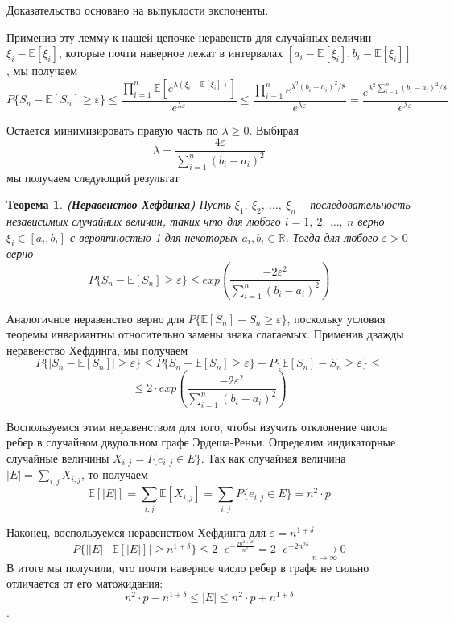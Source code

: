 \documentclass[a4paper]{article}
\newtheorem{mtheorem}{Теорема}[section]
\begin{document}
Доказательство основано на выпуклости экспоненты.

Применив эту лемму к нашей цепочке неравенств для случайных величин $\xi_i - \mathbb{E}[\xi_i]$, которые
почти наверное лежат в интервалах $[a_i - \mathbb{E}[\xi_i], b_i - \mathbb{E}[\xi_i]]$, мы получаем 
$$P\{S_n - \mathbb{E}[S_n] \geq \varepsilon\} \leq \frac{\prod\limits_{i=1}^n\mathbb{E}[e^{\lambda(\xi_i - \mathbb{E}[\xi_i])}]}{e^{\lambda\varepsilon}} \leq 
 \frac{\prod\limits_{i=1}^ne^{\lambda^2(b_i-a_i)^2/8}}{e^{\lambda\varepsilon}} = \frac{e^{\lambda^2\sum\limits_{i=1}^n(b_i-a_i)^2/8}}{e^{\lambda\varepsilon}}$$

Остается минимизировать правую часть по $\lambda \geq 0$. Выбирая $$\lambda = \frac{4\varepsilon}{\sum\limits_{i=1}^n(b_i-a_i)^2}$$ 
мы получаем следующий результат 
\begin{mtheorem}\emph{\textbf{(Неравенство Хефдинга)}}
    Пусть $\xi_1,\ \xi_2,\ \dots,\ \xi_n$ -- последовательность независимых случайных величин, таких что 
для любого $i = 1,\ 2,\ \ldots,\ n$ верно $\xi_i \in [a_i, b_i]$ с вероятностью 1 для некоторых 
$a_i, b_i \in \mathbb{R}$. Тогда для любого $\varepsilon > 0$ верно $$P\{S_n - \mathbb{E}[S_n]\geq 
\varepsilon\} \leq exp\left(\frac{-2\varepsilon^2}{\sum\limits_{i=1}^n(b_i - a_i)^2}\right)$$
\end{mtheorem}

Аналогичное неравенство верно для $P\{\mathbb{E}[S_n] - S_n\geq \varepsilon\}$, поскольку условия теоремы 
инвариантны относительно замены знака слагаемых. Применив дважды неравенство Хефдинга, мы получаем 
$$P\{|S_n - \mathbb{E}[S_n]|\geq \varepsilon\} \leq P\{S_n - \mathbb{E}[S_n]\geq \varepsilon\} + 
P\{\mathbb{E}[S_n] - S_n\geq \varepsilon\} \leq $$ $$\leq 2\cdot exp\left(\frac{-2\varepsilon^2}{\sum\limits_{i=1}^n(b_i - a_i)^2}\right)$$

Воспользуемся этим неравенством для того, чтобы изучить отклонение числа ребер в случайном двудольном 
графе Эрдеша-Реньи. Определим индикаторные случайные величины $X_{i, j} = I\{e_{i,j}\in E\}$. Так как случайная 
величина $|E| = \sum\limits_{i,j}X_{i,j}$, то получаем $$\mathbb{E}[|E|] = \sum\limits_{i,j}\mathbb{E}[X_{i,j}] = 
\sum\limits_{i,j}P\{e_{i,j}\in E\} = n^2\cdot p$$

Наконец, воспользуемся неравенством Хефдинга для $\varepsilon = n^{1+\delta}$ $$ P\{||E| - \mathbb{E}[|E|]| \geq
n^{1+\delta}\} \leq 2\cdot e^{-\frac{2n^{2+2\delta}}{n^2}} = 2\cdot e^{-2n^{2\delta}} \xrightarrow[n \to \infty]{} 0 $$ 
В итоге мы получили, что почти наверное число ребер в графе не сильно отличается от его матожидания: 
$$n^2\cdot p - n^{1+\delta} \leq |E| \leq n^2\cdot p + n^{1+\delta}$$.
\end{document}
